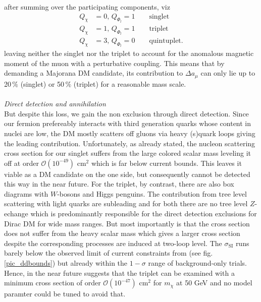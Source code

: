 after summing over the participating components, viz
\begin{align}
 Q_\chi &= 0,\,Q_{\Phi_l} = 1 \qquad \text{singlet}\\
 Q_\chi &= 1,\,Q_{\Phi_l} = 1 \qquad \text{triplet}\\
 Q_\chi &= 3,\,Q_{\Phi_l} = 0 \qquad \text{quintuplet}.
\end{align}
leaving neither the singlet nor the triplet to account for the anomalous magnetic moment of the muon with a perturbative coupling. This means that
by demanding a Majorana DM candidate, its contribution to $\Delta a_\mu$ can only lie up to 20$\,\%$ (singlet) or 50$\,\%$ (triplet) for a reasonable 
mass scale. 
\\ \\ \textit{Direct detection and annihilation}\\
\noindent But despite this loss, we gain the non exclusion through direct detection. Since our fermion prefereably interacts with third generation
quarks whose content in nuclei are low, the DM mostly scatters off gluons via heavy (s)quark loops giving the leading contribution. Unfortunately,
as already stated, the nucleon scattering cross section for our singlet suffers from the large colored scalar mass leveling it off at order 
$\mathcal{O}(10^{-49})$ cm$^2$ which is far below current bounds. This leaves it viable as a DM candidate on the one side, but consequently cannot
be detected this way in the near future. For the triplet, by contrast, there are also box diagrams with $W$-bosons and Higgs penguins. The contribution
from tree level scattering with light quarks are subleading and for both there are no tree level $Z$-echange which is predominantly responsible
for the direct detection exclusions for Dirac DM for wide mass ranges. But most importantly is that the cross section does not suffer from the 
heavy scalar mass which gives a larger cross section despite the corresponding processes are induced at two-loop level. The $\sigma_\text{SI}$
runs barely below the observed limit of current constraints from \cite{1607.02475} (see fig. \ref{pic_ddbounds}) but already within the $1-\sigma$
range of background-only trials. Hence, in the near future \cite{1512.07501} suggests that the triplet can be examined with a minimum cross section
of order $\mathcal{O}(10^{-47})$ cm$^2$ for $m_\chi$ at 50 GeV and no model paramter could be tuned to avoid that.\\
% 
